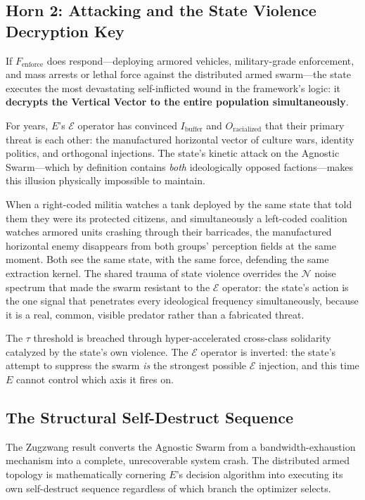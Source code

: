 \subsection{Horn 2: Attacking and the State Violence Decryption Key}

If $F_{\text{enforce}}$ does respond---deploying armored vehicles, military-grade enforcement, and mass arrests or lethal force against the distributed armed swarm---the state executes the most devastating self-inflicted wound in the framework's logic: it \textbf{decrypts the Vertical Vector to the entire population simultaneously}.

For years, $E$'s $\mathcal{E}$ operator has convinced $I_{\text{buffer}}$ and $O_{\text{racialized}}$ that their primary threat is each other: the manufactured horizontal vector of culture wars, identity politics, and orthogonal injections. The state's kinetic attack on the Agnostic Swarm---which by definition contains \textit{both} ideologically opposed factions---makes this illusion physically impossible to maintain.

When a right-coded militia watches a tank deployed by the same state that told them they were its protected citizens, and simultaneously a left-coded coalition watches armored units crashing through their barricades, the manufactured horizontal enemy disappears from both groups' perception fields at the same moment. Both see the same state, with the same force, defending the same extraction kernel. The shared trauma of state violence overrides the $\mathcal{N}$ noise spectrum that made the swarm resistant to the $\mathcal{E}$ operator: the state's action is the one signal that penetrates every ideological frequency simultaneously, because it is a real, common, visible predator rather than a fabricated threat.

The $\tau$ threshold is breached through hyper-accelerated cross-class solidarity catalyzed by the state's own violence. The $\mathcal{E}$ operator is inverted: the state's attempt to suppress the swarm \textit{is} the strongest possible $\mathcal{E}$ injection, and this time $E$ cannot control which axis it fires on.

\subsection{The Structural Self-Destruct Sequence}

The Zugzwang result converts the Agnostic Swarm from a bandwidth-exhaustion mechanism into a complete, unrecoverable system crash. The distributed armed topology is mathematically cornering $E$'s decision algorithm into executing its own self-destruct sequence regardless of which branch the optimizer selects.

